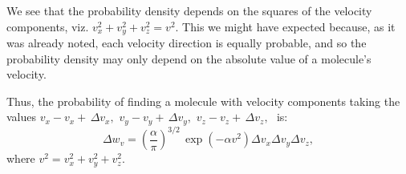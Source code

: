We see that the probability density depends on the squares of the velocity components, viz. $v_{x}^{2}+ v_{y}^{2} + v_{z}^{2}= v^{2}$. This we might have expected because, as it was already noted, each velocity direction is equally probable, and so the probability density may only depend on the absolute value of a molecule's velocity.

Thus, the probability of finding a molecule with velocity components taking the values $v_{x} - v_{x} + \, \Delta v_{x}, \,\, v_{y} - v_{y} + \, \Delta v_{y}, \,\,v_{z} - v_{z} + \, \Delta v_{z}, \,\,$ is:
\begin{equation}%
\Delta w_{v}  = \left(\frac{\alpha}{\pi} \right) ^{3/2} \, \exp (- \alpha v^{2})  \Delta v_{x} \Delta v_{y} \Delta v_{z},
\label{eq-4.18}
\end{equation}
where $v^{2} = v_{x}^{2}+ v_{y}^{2} + v_{z}^{2}$.

